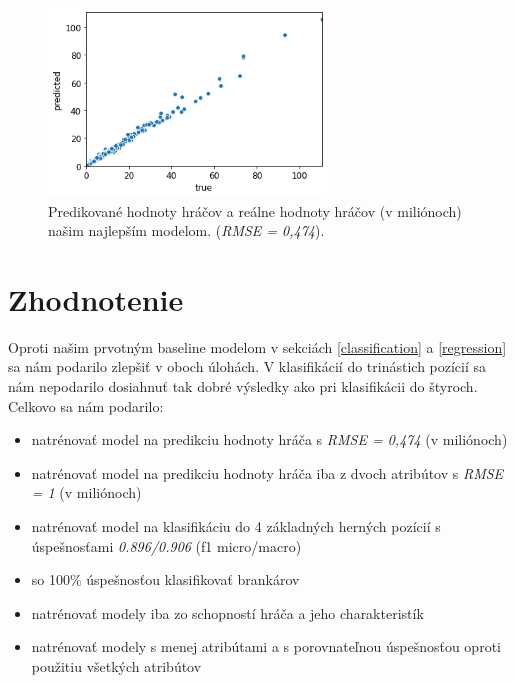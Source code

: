 \documentclass[runningheads]{llncs}
\begin{document}
\begin{figure}[htp]
    \centering
    \includegraphics[height=5cm]{images/gbt_regression}
    \caption{Predikované hodnoty hráčov a reálne hodnoty hráčov (v miliónoch) našim najlepším modelom. (\textit{RMSE = 0,474}).}
    \label{fig:gbt_regression}
\end{figure}


\section{Zhodnotenie}

Oproti našim prvotným baseline modelom v sekciách \ref{classification}  a \ref{regression} sa nám podarilo zlepšiť v oboch úlohách. V klasifikácií do trinástich pozícií sa nám nepodarilo dosiahnuť tak dobré výsledky ako pri klasifikácii do štyroch. Celkovo sa nám podarilo:
\begin{itemize}
    \item natrénovať model na predikciu hodnoty hráča s \textit{RMSE = 0,474} (v miliónoch)
    \item natrénovať model na predikciu hodnoty hráča iba z dvoch atribútov s \textit{RMSE = 1} (v miliónoch)
    \item natrénovať model na klasifikáciu do 4 základných herných pozícií s úspešnosťami \textit{0.896/0.906} (f1 micro/macro)
    \item so 100\% úspešnosťou klasifikovať brankárov
    \item natrénovať modely iba zo schopností hráča a jeho charakteristík
    \item natrénovať modely s menej atribútami a s porovnateľnou úspešnosťou oproti použitiu všetkých atribútov
\end{itemize}

\newpage



\end{document}
